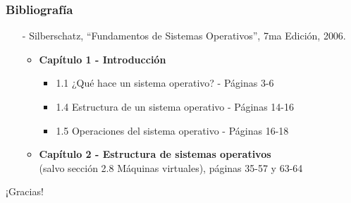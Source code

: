 \documentclass[aspectratio=169]{beamer}
\begin{document}
\begin{frame}[fragile,c]
    \frametitle{Bibliografía}
    \begin{itemize}
        \setlength\itemsep{0.5cm}
        \item[-] \small Silberschatz, ``Fundamentos de Sistemas Operativos'', 7ma Edición, 2006.\\
        \vspace{0.4cm}
        \begin{itemize}
            \setlength\itemsep{0.5cm}
            \item \textbf{Capítulo 1 - Introducción}
            \begin{itemize}
                \setlength\itemsep{0.2cm}
                \item 1.1 ¿Qué hace un sistema operativo? - Páginas 3-6
                \item 1.4 Estructura de un sistema operativo - Páginas 14-16
                \item 1.5 Operaciones del sistema operativo - Páginas 16-18
            \end{itemize}
            \item \textbf{Capítulo 2 - Estructura de sistemas operativos}\\ (salvo sección 2.8 Máquinas virtuales), páginas 35-57 y 63-64
        \end{itemize}
    \end{itemize}
\end{frame}

\begin{frame}[plain]
    \begin{center}
    \vspace{2cm}
    \huge ¡Gracias!\\
    \vspace{2cm}
    \end{center}
\end{frame}
\end{document}
